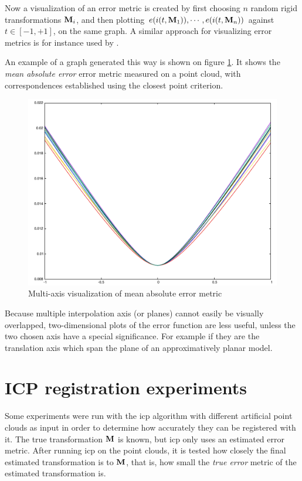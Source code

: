 Now a visualization of an error metric is created by first choosing $n$ random rigid transformations $\mathbf{M}_i$, and then plotting $e(i(t, \mathbf{M}_1)), \cdots, e(i(t, \mathbf{M}_n))$ against $t \in [-1, +1]$, on the same graph. A similar approach for visualizing error metrics is for instance used by \cite{Boua2013}.

An example of a graph generated this way is shown on figure \ref{fig:mea_plot}. It shows the \emph{mean absolute error} error metric measured on a point cloud, with correspondences established using the closest point criterion.

\begin{figure}[h]
\centering
\includegraphics[width=.5\textwidth]{fig/mea_plot.pdf}
\caption{Multi-axis visualization of mean absolute error metric}
\label{fig:mea_plot}
\end{figure}

Because multiple interpolation axis (or planes) cannot easily be visually overlapped, two-dimensional plots of the error function are less useful, unless the two chosen axis have a special significance. For example if they are the translation axis which span the plane of an approximatively planar model.


\newpage



\section{ICP registration experiments} \label{sec:icp_reg_exp}
Some experiments were run with the \gls{icp} algorithm with different artificial point clouds as input in order to determine how accurately they can be registered with it. The true transformation $\mathbf{M}$ is known, but \gls{icp} only uses an estimated error metric. After running \gls{icp} on the point clouds, it is tested how closely the final estimated transformation is to $\mathbf{M}$, that is, how small the \emph{true error} metric of the estimated transformation is.

